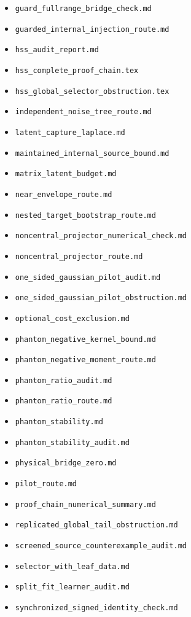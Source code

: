 \documentclass[11pt,oneside,openany,a4paper]{report}
\numberwithin{equation}{chapter}
\theoremstyle{definition}
\theoremstyle{remark}
\newcommand{\sourcefile}[1]{{\small\nolinkurl{#1}}}
\begin{document}
\begin{itemize}[leftmargin=1.3em,itemsep=1pt,topsep=3pt]
\item \sourcefile{guard_fullrange_bridge_check.md}
\item \sourcefile{guarded_internal_injection_route.md}
\item \sourcefile{hss_audit_report.md}
\item \sourcefile{hss_complete_proof_chain.tex}
\item \sourcefile{hss_global_selector_obstruction.tex}
\item \sourcefile{independent_noise_tree_route.md}
\item \sourcefile{latent_capture_laplace.md}
\item \sourcefile{maintained_internal_source_bound.md}
\item \sourcefile{matrix_latent_budget.md}
\item \sourcefile{near_envelope_route.md}
\item \sourcefile{nested_target_bootstrap_route.md}
\item \sourcefile{noncentral_projector_numerical_check.md}
\item \sourcefile{noncentral_projector_route.md}
\item \sourcefile{one_sided_gaussian_pilot_audit.md}
\item \sourcefile{one_sided_gaussian_pilot_obstruction.md}
\item \sourcefile{optional_cost_exclusion.md}
\item \sourcefile{phantom_negative_kernel_bound.md}
\item \sourcefile{phantom_negative_moment_route.md}
\item \sourcefile{phantom_ratio_audit.md}
\item \sourcefile{phantom_ratio_route.md}
\item \sourcefile{phantom_stability.md}
\item \sourcefile{phantom_stability_audit.md}
\item \sourcefile{physical_bridge_zero.md}
\item \sourcefile{pilot_route.md}
\item \sourcefile{proof_chain_numerical_summary.md}
\item \sourcefile{replicated_global_tail_obstruction.md}
\item \sourcefile{screened_source_counterexample_audit.md}
\item \sourcefile{selector_with_leaf_data.md}
\item \sourcefile{split_fit_learner_audit.md}
\item \sourcefile{synchronized_signed_identity_check.md}

\end{itemize}
\end{document}
